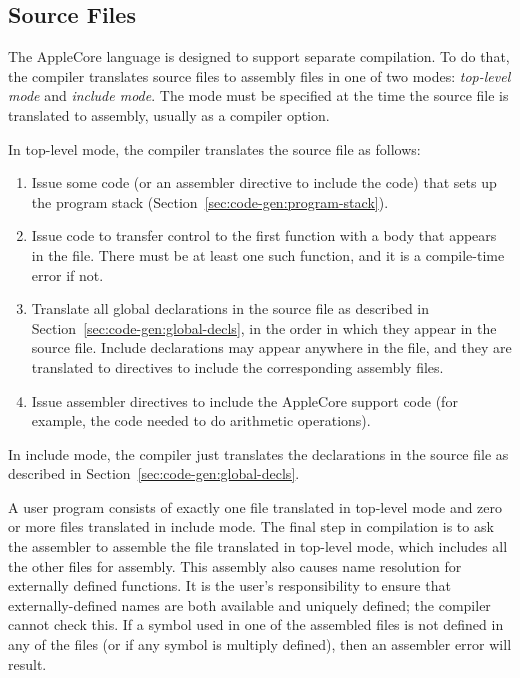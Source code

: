 \documentclass[10pt]{article}
\begin{document}
\subsection{Source Files}
\label{sec:code-gen:source-files}

The AppleCore language is designed to support separate compilation.
To do that, the compiler translates source files to assembly files in
one of two modes: \emph{top-level mode} and \emph{include mode}.  The
mode must be specified at the time the source file is translated to
assembly, usually as a compiler option.

  In top-level mode, the compiler translates
the source file as follows:
%
\begin{enumerate}
%
\item Issue some code (or an assembler directive to include the code)
  that sets up the program stack
  (Section~\ref{sec:code-gen:program-stack}).
%
\item Issue code to transfer control to the first function with a body
  that appears in the file.  There must be at least one such function,
  and it is a compile-time error if not.
%
\item Translate all global declarations in the source file as
  described in Section~\ref{sec:code-gen:global-decls}, in the
  order in which they appear in the source file.  Include declarations
  may appear anywhere in the file, and they are translated to
  directives to include the corresponding assembly files.
%
\item Issue assembler directives to include the AppleCore support code
  (for example, the code needed to do arithmetic operations).
%
\end{enumerate}
%

 In include mode, the compiler just translates
the declarations in the source file as described in
Section~\ref{sec:code-gen:global-decls}.

 A user program consists
of exactly one file translated in top-level mode and zero or more
files translated in include mode.  The final step in compilation is to
ask the assembler to assemble the file translated in top-level mode,
which includes all the other files for assembly.  This assembly also
causes name resolution for externally defined functions.  It is the
user's responsibility to ensure that externally-defined names are both
available and uniquely defined; the compiler cannot check this.  If a
symbol used in one of the assembled files is not defined in any of the
files (or if any symbol is multiply defined), then an assembler error
will result.
\end{document}
